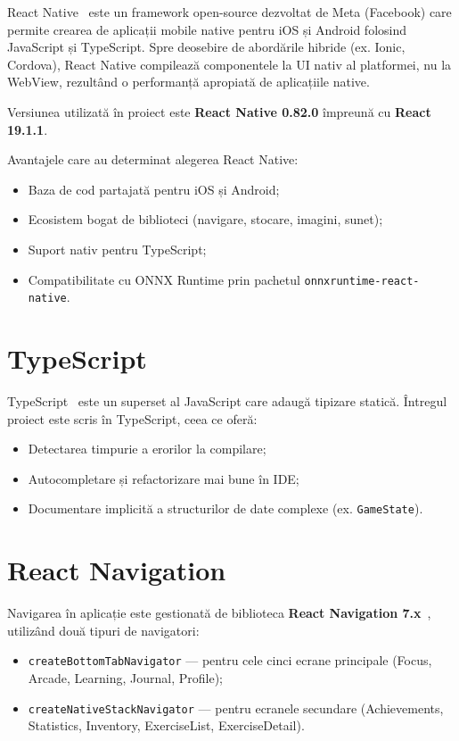\documentclass[12pt, a4paper, twoside]{report}
\numberwithin{equation}{section}
\begin{document}
React Native~\cite{reactnative} este un framework open-source dezvoltat de Meta (Facebook) care permite
crearea de aplicații mobile native pentru iOS și Android folosind JavaScript și TypeScript.
Spre deosebire de abordările hibride (ex. Ionic, Cordova), React Native compilează
componentele la UI nativ al platformei, nu la WebView, rezultând o performanță apropiată
de aplicațiile native.

Versiunea utilizată în proiect este \textbf{React Native 0.82.0} împreună cu
\textbf{React 19.1.1}.

Avantajele care au determinat alegerea React Native:
\begin{itemize}
  \item Baza de cod partajată pentru iOS și Android;
  \item Ecosistem bogat de biblioteci (navigare, stocare, imagini, sunet);
  \item Suport nativ pentru TypeScript;
  \item Compatibilitate cu ONNX Runtime prin pachetul \texttt{onnxruntime-react-native}.
\end{itemize}

\section{TypeScript}

TypeScript~\cite{typescript} este un superset al JavaScript care adaugă tipizare statică. Întregul proiect
este scris în TypeScript, ceea ce oferă:
\begin{itemize}
  \item Detectarea timpurie a erorilor la compilare;
  \item Autocompletare și refactorizare mai bune în IDE;
  \item Documentare implicită a structurilor de date complexe (ex. \texttt{GameState}).
\end{itemize}

\section{React Navigation}

Navigarea în aplicație este gestionată de biblioteca \textbf{React Navigation 7.x}~\cite{reactnavigation},
utilizând două tipuri de navigatori:
\begin{itemize}
  \item \texttt{createBottomTabNavigator} — pentru cele cinci ecrane principale
    (Focus, Arcade, Learning, Journal, Profile);
  \item \texttt{createNativeStackNavigator} — pentru ecranele secundare
    (Achievements, Statistics, Inventory, ExerciseList, ExerciseDetail).
\end{itemize}
\end{document}
